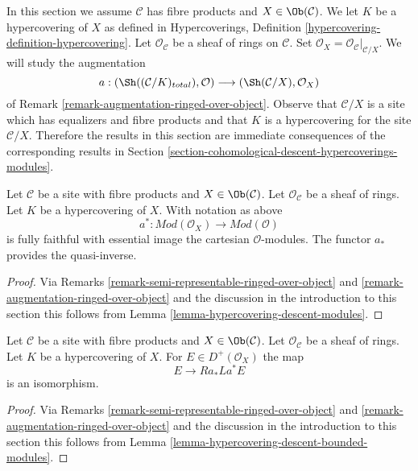 \noindent
In this section we assume $\mathcal{C}$ has fibre products
and $X \in \Ob(\mathcal{C})$. We let $K$ be a hypercovering of $X$
as defined in
Hypercoverings, Definition \ref{hypercovering-definition-hypercovering}.
Let $\mathcal{O}_\mathcal{C}$ be a sheaf of rings on $\mathcal{C}$.
Set $\mathcal{O}_X = \mathcal{O}_\mathcal{C}|_{\mathcal{C}/X}$.
We will study the augmentation
$$
a :
(\Sh((\mathcal{C}/K)_{total}), \mathcal{O})
\longrightarrow
(\Sh(\mathcal{C}/X), \mathcal{O}_X)
$$
of Remark \ref{remark-augmentation-ringed-over-object}.
Observe that $\mathcal{C}/X$ is a site which has equalizers
and fibre products and that $K$ is a
hypercovering for the site $\mathcal{C}/X$.
Therefore the results in this section are immediate consequences
of the corresponding results in
Section \ref{section-cohomological-descent-hypercoverings-modules}.

\begin{lemma}
\label{lemma-hypercovering-X-descent-modules}
Let $\mathcal{C}$ be a site with fibre products and $X \in \Ob(\mathcal{C})$.
Let $\mathcal{O}_\mathcal{C}$ be a sheaf of rings.
Let $K$ be a hypercovering of $X$. With notation as above
$$
a^* : \textit{Mod}(\mathcal{O}_X) \to \textit{Mod}(\mathcal{O})
$$
is fully faithful with essential image the cartesian $\mathcal{O}$-modules.
The functor $a_*$ provides the quasi-inverse.
\end{lemma}

\begin{proof}
Via Remarks \ref{remark-semi-representable-ringed-over-object} and
\ref{remark-augmentation-ringed-over-object} and the discussion in
the introduction to this section
this follows from Lemma \ref{lemma-hypercovering-descent-modules}.
\end{proof}

\begin{lemma}
\label{lemma-hypercovering-X-descent-bounded-modules}
Let $\mathcal{C}$ be a site with fibre products and $X \in \Ob(\mathcal{C})$.
Let $\mathcal{O}_\mathcal{C}$ be a sheaf of rings.
Let $K$ be a hypercovering of $X$. For
$E \in D^+(\mathcal{O}_X)$ the map
$$
E \longrightarrow Ra_*La^*E
$$
is an isomorphism.
\end{lemma}

\begin{proof}
Via Remarks \ref{remark-semi-representable-ringed-over-object} and
\ref{remark-augmentation-ringed-over-object} and the discussion in
the introduction to this section
this follows from Lemma \ref{lemma-hypercovering-descent-bounded-modules}.
\end{proof}

